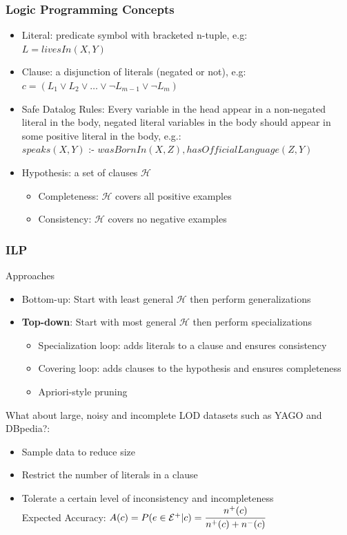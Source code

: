 \documentclass{beamer}
\begin{document}
\begin{frame}
\frametitle{Logic Programming Concepts}
  \begin{itemize}
   \item Literal: predicate symbol with bracketed n-tuple, e.g: \\ 
      \quad $L=livesIn(X,Y)$
   \item Clause: a disjunction of literals (negated or not), e.g: \\ 
      \quad $c=(L_1 \vee L_2 \vee \ldots \vee \neg L_{m-1} \vee \neg L_{m})$
   \item Safe Datalog Rules: Every variable in the head appear in a non-negated literal in the body, negated literal
variables in the body should appear in some positive literal in the body, e.g.: \\ 
    \quad $speaks(X,Y)$ :- $wasBornIn(X,Z),hasOfficialLanguage(Z,Y)$
   \item Hypothesis: a set of clauses $\mathcal{H}$
     \begin{itemize}
	\item Completeness: $\mathcal{H}$ covers all positive examples
	\item Consistency: $\mathcal{H}$ covers no negative examples
     \end{itemize}
  \end{itemize}
\end{frame}
\begin{frame}
\frametitle{ILP}
Approaches
  \begin{itemize}
   \item Bottom-up: Start with least general $\mathcal{H}$ then perform generalizations
   \item \textbf{Top-down}: Start with most general $\mathcal{H}$ then perform specializations
   \begin{itemize}
    \item Specialization loop: adds literals to a clause and ensures consistency
    \item Covering loop: adds clauses to the hypothesis and ensures completeness
    \item Apriori-style pruning
   \end{itemize}
  \end{itemize}
What about large, noisy and incomplete LOD datasets such as YAGO and DBpedia?:
\begin{itemize}
   \item Sample data to reduce size
   \item Restrict the number of literals in a clause
   \item Tolerate a certain level of inconsistency and incompleteness \\ \quad
      Expected Accuracy:  $A(c)=P(e \in \mathcal{E}^{+}|c)=\cfrac{n^{+}(c)}{n^{+}(c)+n^{-}(c)}$
  \end{itemize}
\end{frame}
\end{document}
